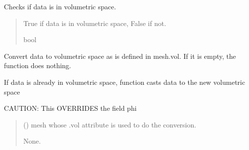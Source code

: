 \documentclass[letterpaper,10pt,english]{sphinxmanual}
\begin{document}
\begin{fulllineitems}
\begin{fulllineitems}
\label{\detokenize{_autosummary/nirfasterff.base.data.FDdata:nirfasterff.base.data.FDdata.isvol}}
\pysigstartsignatures
\pysiglinewithargsret
{}
{}
{}
\pysigstopsignatures
\sphinxAtStartPar
Checks if data is in volumetric space.
\begin{quote}\begin{description}
\sphinxAtStartPar
True if data is in volumetric space, False if not.

\sphinxAtStartPar
bool

\end{description}\end{quote}

\end{fulllineitems}


\begin{fulllineitems}
\label{\detokenize{_autosummary/nirfasterff.base.data.FDdata:nirfasterff.base.data.FDdata.togrid}}
\pysigstartsignatures
\pysiglinewithargsret
{}
{}
{}
\pysigstopsignatures
\sphinxAtStartPar
Convert data to volumetric space as is defined in mesh.vol. If it is empty, the function does nothing.

\sphinxAtStartPar
If data is already in volumetric space, function casts data to the new volumetric space

\sphinxAtStartPar
CAUTION: This OVERRIDES the field phi
\begin{quote}\begin{description}
\sphinxAtStartPar
{} () \textendash{} mesh whose .vol attribute is used to do the conversion.

\sphinxAtStartPar
None.

\end{description}\end{quote}

\end{fulllineitems}



\end{fulllineitems}
\end{document}
